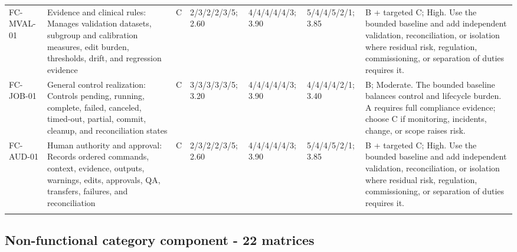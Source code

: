 \documentclass[11pt,letterpaper]{article}
\begin{document}
\begin{scriptsize}
\begin{longtable}{@{}L{0.11\textwidth}L{0.165\textwidth}L{0.04\textwidth}L{0.115\textwidth}L{0.115\textwidth}L{0.115\textwidth}L{0.235\textwidth}@{}}
\addlinespace[2pt]
FC-MVAL-01 & Evidence and clinical rules: Manages validation datasets, subgroup and calibration measures, edit burden, thresholds, drift, and regression evidence & C & 2/3/2/2/3/5; 2.60 & 4/4/4/4/4/3; 3.90 & 5/4/4/5/2/1; 3.85 & B + targeted C; High. Use the bounded baseline and add independent validation, reconciliation, or isolation where residual risk, regulation, commissioning, or separation of duties requires it. \\
\addlinespace[2pt]
FC-JOB-01 & General control realization: Controls pending, running, complete, failed, canceled, timed-out, partial, commit, cleanup, and reconciliation states & C & 3/3/3/3/3/5; 3.20 & 4/4/4/4/4/3; 3.90 & 4/4/4/4/2/1; 3.40 & B; Moderate. The bounded baseline balances control and lifecycle burden. A requires full compliance evidence; choose C if monitoring, incidents, change, or scope raises risk. \\
\addlinespace[2pt]
FC-AUD-01 & Human authority and approval: Records ordered commands, context, evidence, outputs, warnings, edits, approvals, QA, transfers, failures, and reconciliation & C & 2/3/2/2/3/5; 2.60 & 4/4/4/4/4/3; 3.90 & 5/4/4/5/2/1; 3.85 & B + targeted C; High. Use the bounded baseline and add independent validation, reconciliation, or isolation where residual risk, regulation, commissioning, or separation of duties requires it. \\
\addlinespace[2pt]
\end{longtable}
\end{scriptsize}

\subsection{Non-functional category component - 22 matrices}
\end{document}
